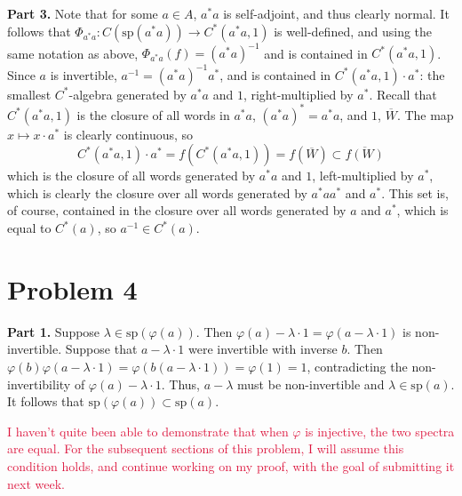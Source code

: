 \documentclass[aps,pra,showpacs,notitlepage,onecolumn,superscriptaddress,nofootinbib]{revtex4-1}
\newcommand{\pop}[1]{\textcolor{crimson}{#1}}
\newcommand{\hhrulefill}{\hspace{-1.0em}\hrulefill}
\theoremstyle{definition}
\begin{document}
\noindent \textbf{Part 3.} Note that for some $a \in A$, $a^{*} a$ is self-adjoint, and thus clearly normal. It follows that $\Phi_{a^{*} a} : C(\text{sp}(a^{*} a)) \rightarrow C^{*}(a^{*}a, 1)$ is well-defined, and using the same notation as above,
$\Phi_{a^{*} a}(f) = (a^{*} a)^{-1}$ and is contained in $C^{*}(a^{*} a, 1)$. Since $a$ is invertible, $a^{-1} = (a^{*} a)^{-1} a^{*}$, and is contained in $C^{*}(a^{*} a, 1) \cdot a^{*}$: the smallest $C^{*}$-algebra generated by $a^{*} a$ and $1$, right-multiplied
by $a^{*}$. Recall that $C^{*}(a^{*} a, 1)$ is the closure of all words in $a^{*} a$, $(a^{*} a)^{*} = a^{*} a$, and $1$, $\overline{W}$. The map $x \mapsto x \cdot a^{*}$ is clearly continuous, so
\begin{equation}
  C^{*}(a^{*} a, 1) \cdot a^{*} = f(C^{*}(a^{*} a, 1)) = f(\overline{W}) \subset \overline{f(W)}
\end{equation}
which is the closure of all words generated by $a^{*} a$ and $1$, left-multiplied by $a^{*}$, which is clearly the closure over all words generated by $a^{*} a a^{*}$ and $a^{*}$. This set is, of course, contained in the closure over all words
generated by $a$ and $a^{*}$, which is equal to $C^{*}(a)$, so $a^{-1} \in C^{*}(a)$.

\hhrulefill

\section{Problem 4}

\noindent \textbf{Part 1.} Suppose $\lambda \in \text{sp}(\varphi(a))$. Then $\varphi(a) - \lambda \cdot 1 = \varphi(a - \lambda \cdot 1)$ is non-invertible. Suppose that $a - \lambda \cdot 1$ were invertible with inverse $b$. Then
$\varphi(b) \varphi(a - \lambda \cdot 1) = \varphi(b (a - \lambda \cdot 1)) = \varphi(1) = 1$, contradicting the non-invertibility of $\varphi(a) - \lambda \cdot 1$. Thus, $a - \lambda$ must be non-invertible and $\lambda \in \text{sp}(a)$. It follows
that $\text{sp}(\varphi(a)) \subset \text{sp}(a)$.

\pop{I haven't quite been able to demonstrate that when $\varphi$ is injective, the two spectra are equal. For the subsequent sections of this problem, I will assume this condition holds, and continue working on my proof, with the goal
  of submitting it next week.}
\newline
\end{document}
